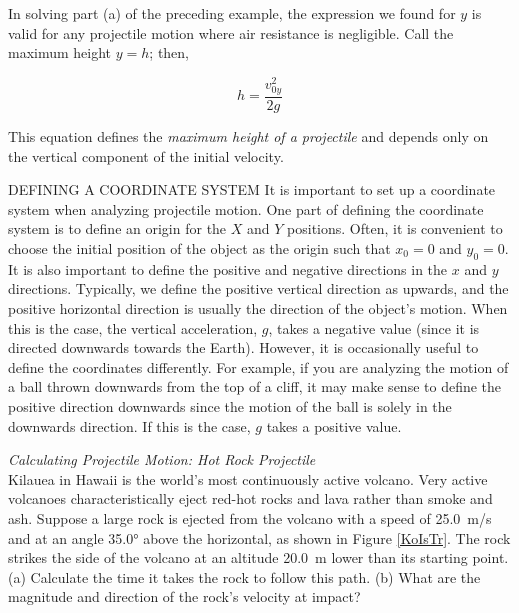 \documentclass[../../main-ap-physics.tex]{subfiles}
\begin{document}
\endsolution

In solving part (a) of the preceding example, the expression we found for $y$ is valid for any projectile motion where air resistance is negligible. Call the maximum height $y=h$; then,

\begin{equation}
    h = \frac{v_{0y}^2}{2g}
\end{equation}

This equation defines the \textit{maximum height of a projectile} and depends only on the vertical component of the initial velocity.

\begin{gradient}{DEFINING A COORDINATE SYSTEM}
    It is important to set up a coordinate system when analyzing projectile motion. One part of defining the coordinate system is to define an origin for the $X$ and $Y$ positions. Often, it is convenient to choose the initial position of the object as the origin such that $x_0 = 0$ and $y_0 = 0$. It is also important to define the positive and negative directions in the $x$ and $y$ directions. Typically, we define the positive vertical direction as upwards, and the positive horizontal direction is usually the direction of the object’s motion. When this is the case, the vertical acceleration, $g$, takes a negative value (since it is directed downwards towards the Earth). However, it is occasionally useful to define the coordinates differently. For example, if you are analyzing the motion of a ball thrown downwards from the top of a cliff, it may make sense to define the positive direction downwards since the motion of the ball is solely in the downwards direction. If this is the case, $g$ takes a positive value.
\end{gradient}

\begin{example}
\textit{Calculating Projectile Motion: Hot Rock Projectile}\\
    Kilauea in Hawaii is the world's most continuously active volcano. Very active volcanoes characteristically eject red-hot rocks and lava rather than smoke and ash. Suppose a large rock is ejected from the volcano with a speed of \SI{25.0}{m/s} and at an angle \ang{35.0} above the horizontal, as shown in Figure \ref{KoIsTr}. The rock strikes the side of the volcano at an altitude \SI{20.0}{m} lower than its starting point. (a) Calculate the time it takes the rock to follow this path. (b) What are the magnitude and direction of the rock's velocity at impact?
\end{example}
\end{document}
